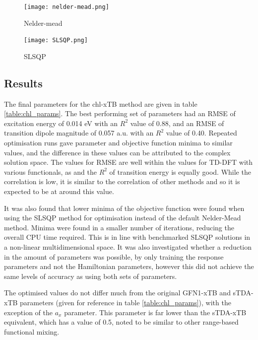 \begin{figure}
    \texttt{[image: nelder-mead.png]}
    \caption{Nelder-mead}
    \label{fig:nelder_mead}
\end{figure}

\begin{figure}
    \texttt{[image: SLSQP.png]}
    \caption{SLSQP}
    \label{fig:slsqp}
\end{figure}

\afterpartskip

\subsection{Results}
\label{subsec:chl_opt_results}

The final parameters for the chl-xTB method are given in table \ref{table:chl_params}.
The best performing set of parameters had an RMSE of excitation energy of 0.014 eV 
with an $R^2$ value of 0.88, and an RMSE of transition dipole magnitude of 0.057 a.u. 
with an $R^2$ value of 0.40. Repeated optimisation runs gave parameter and objective
function minima to similar values, and the difference in these values can be attributed
to the complex solution space. The values for RMSE are well within the values for
TD-DFT with various functionals, as and the $R^2$ of transition energy is equally
good. While the correlation is low, it is similar to the correlation of other methods
and so it is expected to be at around this value.

It was also found that lower minima of the objective function were found when using
the SLSQP method for optimisation instead of the default Nelder-Mead method. Minima
were found in a smaller number of iterations, reducing the overall CPU time required.
This is in line with benchmarked SLSQP solutions in a non-linear multidimensional space.
It was also investigated whether a reduction in the amount of parameters was possible,
by only training the response parameters and not the Hamiltonian parameters, however 
this did not achieve the same levels of accuracy as using both sets of parameters.

The optimised values do not differ much from the original GFN1-xTB and sTDA-xTB
parameters (given for reference in table \ref{table:chl_params}), with the exception
of the $a_x$ parameter. This parameter is far lower than the sTDA-xTB equivalent,
which has a value of 0.5, noted to be similar to other range-based functional mixing.

